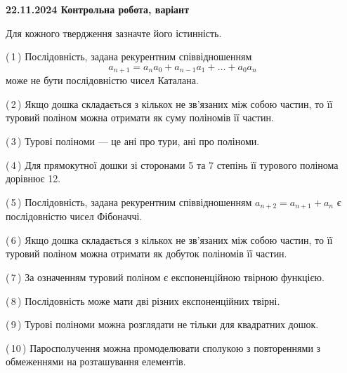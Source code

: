\documentclass[12pt, ukrainian]{article}
\begin{document}
\begin {large}
\begin {large}
\begin {large}
\begin {large}
\begin {large}
\begin {large}
\begin {large}
\begin {large}
\begin {large}
{\vspace{5mm}
}
\newpage

\begin {large}

\textbf{22.11.2024 Контрольна робота, варіант  }\par


{
Для кожного твердження зазначте його істинність.\par

\vspace{2mm}

(\,1\,) Послідовність, задана рекурентним співвідношенням $$a_{n+1}=a_{n}a_{0}+a_{n-1}a_{1}+\ldots+a_0a_{n}$$ може не бути послідовністю чисел Каталана.%



(\,2\,) Якщо дошка складається з кількох не зв’язаних між собою частин, то її туровий поліном можна отримати як суму поліномів її частин.%



(\,3\,) Турові поліноми --- це ані про тури, ані про поліноми.%



(\,4\,) Для прямокутної дошки зі сторонами 5 та 7 степінь її турового полінома дорівнює 12.%



(\,5\,) Послідовність, задана рекурентним співвідношенням $a_{n+2}=a_{n+1}+a_{n}$ є послідовністю чисел Фібоначчі.%



(\,6\,) Якщо дошка складається з кількох не зв’язаних між собою частин, то її туровий поліном можна отримати як добуток поліномів її частин.%



(\,7\,) За означенням туровий поліном є експоненційною твірною функцією.%



(\,8\,) Послідовність може мати дві різних експоненційних твірні.%



(\,9\,) Турові поліноми можна розглядати не тільки для квадратних дошок.%



(\,10\,) Паросполучення можна промоделювати сполукою з повтореннями з обмеженнями на розташування елементів.%




\vspace{5mm}
}
\newpage

\begin {large}


\end{large}
\end{large}
\end{large}
\end{large}
\end{large}
\end{large}
\end{large}
\end{large}
\end{large}
\end{large}
\end{large}
\end{document}
